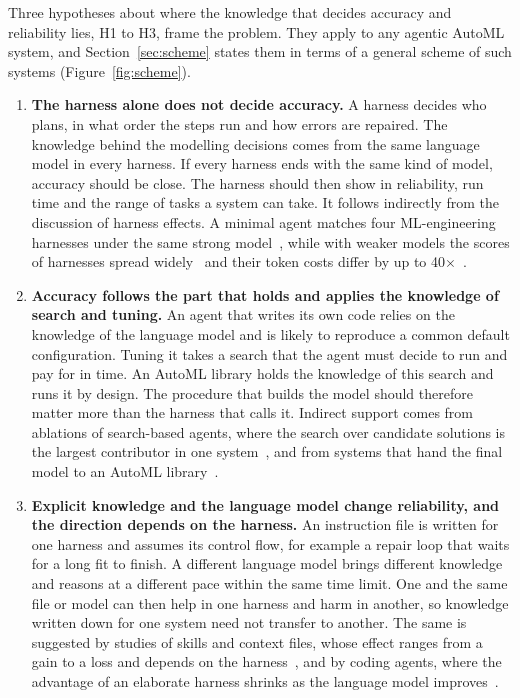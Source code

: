 Three hypotheses about where the knowledge that decides accuracy and
reliability lies, H1 to H3, frame the problem. They apply to any agentic AutoML system, and
Section~\ref{sec:scheme} states them in terms of a general scheme of such
systems (Figure~\ref{fig:scheme}).
\begin{enumerate}
\renewcommand{\labelenumi}{\textbf{H\arabic{enumi}.}}
\renewcommand{\theenumi}{H\arabic{enumi}}
\setlength{\itemsep}{1pt}
\item \textbf{The harness alone does not decide accuracy.}\label{hyp:harness}
  A harness decides who plans, in what order the steps run and how errors
  are repaired. The knowledge behind the modelling decisions comes from the
  same language model in every harness. If every harness ends with the same kind of model, accuracy
  should be close. The harness should then show in reliability, run time and
  the range of tasks a system can take. It follows indirectly from the
  discussion of harness effects. A minimal agent matches four
  ML-engineering harnesses under the same strong
  model~\citep{brilliantov2026harness}, while with weaker models the scores
  of harnesses spread widely~\citep{harnessbench2026} and their token costs
  differ by up to 40$\times$~\citep{scaffoldeffect2026}.
\item \textbf{Accuracy follows the part that holds and applies the
  knowledge of search and tuning.}\label{hyp:builder}
  An agent that writes its own code relies on the knowledge of the language
  model and is likely to reproduce a common default configuration. Tuning it
  takes a search that the agent must decide to run and pay for in time. An
  AutoML library holds the knowledge of this search and runs it by design. The
  procedure that builds the model should therefore matter more than the
  harness that calls it. Indirect support comes from ablations of
  search-based agents, where the search over candidate solutions is the
  largest contributor in one system~\citep{toledo2025aira}, and from systems
  that hand the final model to an AutoML
  library~\citep{fang2025mlzero,lapin2025lightautods}.
\item \textbf{Explicit knowledge and the language model change
  reliability, and the direction depends on the harness.}\label{hyp:interaction}
  An instruction file is written for one harness and assumes its control
  flow, for example a repair loop that waits for a long fit to finish. A
  different language model brings different knowledge and reasons at a
  different pace within the same time limit. One and the same file or model
  can then help in one harness and harm in another, so knowledge written down
  for one system need not transfer to another. The same is suggested by studies of skills
  and context files, whose effect ranges from a gain to a loss and depends on
  the harness~\citep{li2026skillsbench,gloaguen2026agentsmd,yang2025rdagent},
  and by coding agents, where the advantage of an elaborate harness shrinks
  as the language model improves~\citep{hu2026beyondmodel,kapoor2024agents}.
\end{enumerate}

